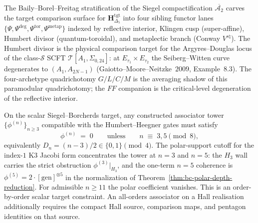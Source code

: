 \begin{remark}
\label{rem:guide-four-siblings}
The Baily--Borel--Freitag stratification of the Siegel
compactification $\overline{\mathcal A_2}$ carves
the target comparison surface for \(\mathbf H_{\Delta_5}^{\mathrm{tgt}}\)
into four sibling functor lanes
$\{\Psi,\Psi^{\deg},\Psi^{\mathrm{tor}},\Psi^{\mathrm{metap}}\}$
indexed by reflective interior, Klingen cusp (super-affine),
Humbert divisor (quantum-toroidal), and metaplectic branch
(Conway $V^{s\natural}$). The Humbert divisor is the
physical comparison target for the Argyres--Douglas locus of the
class-$\mathcal S$ SCFT
$\mathcal T[A_1,\Sigma_{0,24}]$: at $E_{\tau_1}\times E_{\tau_2}$
the Seiberg--Witten curve degenerates to $(A_1,A_{2N-1})$
(Gaiotto--Moore--Neitzke~$2009$, Example~$8.3$). The four-archetype
quadrichotomy $G/L/C/M$ is the averaging shadow of this paramodular
quadrichotomy; the $FF$ companion is the critical-level degeneration
of the reflective interior.
\end{remark}

\begin{remark}
\label{rem:guide-humbert-heegner}
On the scalar Siegel--Borcherds target, any constructed associator
tower \(\{\phi^{(n)}\}_{n\ge 3}\) compatible with the
Humbert--Heegner gates must satisfy
\[
\phi^{(n)} \;=\; 0
\qquad\text{unless}\qquad
n \;\equiv\; 3,5 \pmod 8,
\]
equivalently $D_n = (n-3)/2 \in \{0,1\}\pmod 4$. The polar-support
cutoff for the index-$1$ K3 Jacobi form concentrates the tower at
$n=3$ and $n=5$: the $H_3$ wall carries the strict obstruction
$\phi^{(3)}|_{H_3}$, and the one-term $n=5$ coherence is
$\phi^{(5)}=2\cdot[\mathrm{gen}]^{\otimes 5}$ in the normalization of
Theorem~\ref{thm:bc-polar-depth-reduction}. For admissible
$n\ge11$ the polar coefficient vanishes.  This is an order-by-order
scalar target constraint.  An all-orders associator on a Hall
realisation additionally requires the compact Hall source, comparison
maps, and pentagon identities on that source.
\end{remark}

